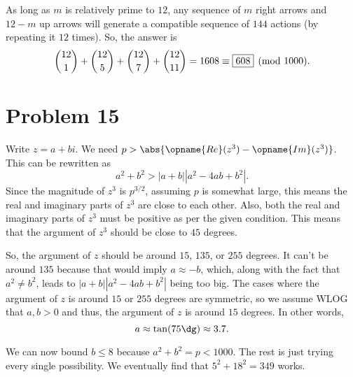\documentclass{scrartcl}
\begin{document}
As long as $m$ is relatively prime to $12$, any sequence of $m$ right arrows
and $12-m$ up arrows will generate a compatible sequence of $144$ actions (by repeating it $12$ times).
So, the answer is
\[ \dbinom{12}{1} + \dbinom{12}{5} + \dbinom{12}{7} + \dbinom{12}{11} = 1608 \equiv \boxed{608} \pmod{1000}. \]
\section*{Problem 15}
Write $z = a + bi$.
We need $p > \abs{\opname{Re}(z^3) - \opname{Im}(z^3)}$.
This can be rewritten as
\[ a^2 + b^2 > |a+b| |a^2 - 4ab + b^2|. \]
Since the magnitude of $z^3$ is $p^{3/2}$, assuming $p$ is somewhat large,
this means the real and imaginary parts of $z^3$ are close to each other.
Also, both the real and imaginary parts of $z^3$ must be positive as per the given condition.
This means that the argument of $z^3$ should be close to $45$ degrees.

So, the argument of $z$ should be around $15$, $135$, or $255$ degrees.
It can't be around $135$ because that would imply $a \approx -b$, which,
along with the fact that $a^2 \neq b^2$, leads to $|a+b| |a^2 - 4ab + b^2|$
being too big.
The cases where the argument of $z$ is around $15$ or $255$ degrees are symmetric,
so we assume WLOG that $a,b > 0$ and thus, the argument of $z$ is around $15$ degrees.
In other words,
\[ a \approx \tan(75\dg) \approx 3.7. \]

We can now bound $b \le 8$ because $a^2 + b^2 = p < 1000$.
The rest is just trying every single possibility.
We eventually find that $5^2 + 18^2 = \boxed{349}$ works.
\end{document}
